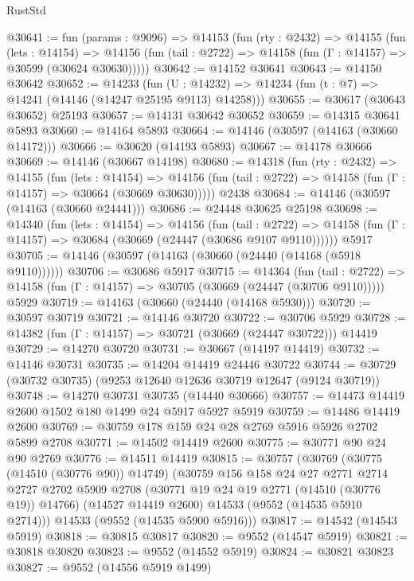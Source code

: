 \begin{lexlean}{RustStd}
\begin{coremodule}
@30641 := fun (params : @9096) =>
  @14153
    (fun (rty : @2432) =>
    @14155
      (fun (lets : @14154) =>
      @14156 (fun (tail : @2722) => @14158 (fun (Γ : @14157) => @30599 (@30624 @30630)))))
@30642 := @14152 @30641
@30643 := @14150 @30642
@30652 := @14233
    (fun (U : @14232) => @14234 (fun (t : @7) => @14241 (@14146 (@14247 @25195 @9113) @14258)))
@30655 := @30617 (@30643 @30652) @25193
@30657 := @14131 @30642 @30652
@30659 := @14315 @30641 @5893
@30660 := @14164 @5893
@30664 := @14146 (@30597 (@14163 (@30660 @14172)))
@30666 := @30620 (@14193 @5893)
@30667 := @14178 @30666
@30669 := @14146 (@30667 @14198)
@30680 := @14318
    (fun (rty : @2432) =>
    @14155
      (fun (lets : @14154) =>
      @14156 (fun (tail : @2722) => @14158 (fun (Γ : @14157) => @30664 (@30669 @30630)))))
    @2438
@30684 := @14146 (@30597 (@14163 (@30660 @24441)))
@30686 := @24448 @30625 @25198
@30698 := @14340
    (fun (lets : @14154) =>
    @14156
      (fun (tail : @2722) =>
      @14158 (fun (Γ : @14157) => @30684 (@30669 (@24447 (@30686 @9107 @9110))))))
    @5917
@30705 := @14146 (@30597 (@14163 (@30660 (@24440 (@14168 (@5918 @9110))))))
@30706 := @30686 @5917
@30715 := @14364
    (fun (tail : @2722) => @14158 (fun (Γ : @14157) => @30705 (@30669 (@24447 (@30706 @9110)))))
    @5929
@30719 := @14163 (@30660 (@24440 (@14168 @5930)))
@30720 := @30597 @30719
@30721 := @14146 @30720
@30722 := @30706 @5929
@30728 := @14382 (fun (Γ : @14157) => @30721 (@30669 (@24447 @30722))) @14419
@30729 := @14270 @30720
@30731 := @30667 (@14197 @14419)
@30732 := @14146 @30731
@30735 := @14204 @14419 @24446 @30722
@30744 := @30729 (@30732 @30735) (@9253 @12640 @12636 @30719 @12647 (@9124 @30719))
@30748 := @14270 @30731 @30735 (@14440 @30666)
@30757 := @14473 @14419 @2600 @1502 @180 @1499 @24 @5917 @5927 @5919
@30759 := @14486 @14419 @2600
@30769 := @30759 @178 @159 @24 @28 @2769 @5916 @5926 @2702 @5899 @2708
@30771 := @14502 @14419 @2600
@30775 := @30771 @90 @24 @90 @2769
@30776 := @14511 @14419
@30815 := @30757
    (@30769
      (@30775 (@14510 (@30776 @90)) @14749)
      (@30759
        @156
        @158
        @24
        @27
        @2771
        @2714
        @2727
        @2702
        @5909
        @2708
        (@30771 @19 @24 @19 @2771 (@14510 (@30776 @19)) @14766)
        (@14527 @14419 @2600)
        @14533
        (@9552 (@14535 @5910 @2714)))
      @14533
      (@9552 (@14535 @5900 @5916)))
@30817 := @14542 (@14543 @5919)
@30818 := @30815 @30817
@30820 := @9552 (@14547 @5919)
@30821 := @30818 @30820
@30823 := @9552 (@14552 @5919)
@30824 := @30821 @30823
@30827 := @9552 (@14556 @5919 @1499)

\end{coremodule}
\end{lexlean}
